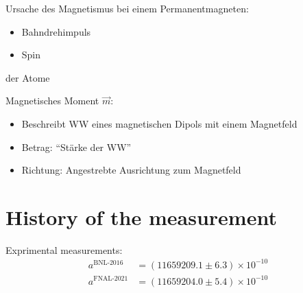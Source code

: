 \documentclass[12pt]{beamer}
\begin{document}
\begin{frame}{\insertsection}
  Ursache des Magnetismus bei einem Permanentmagneten:
  \begin{itemize}
  \item Bahndrehimpuls
  \item Spin
  \end{itemize}
  der Atome
\end{frame}

\begin{frame}{\insertsection}
  Magnetisches Moment $\vec{m}$:
  \begin{itemize}
  \item Beschreibt WW eines magnetischen Dipols mit einem Magnetfeld
  \item Betrag: "`Stärke der WW"'
  \item Richtung: Angestrebte Ausrichtung zum Magnetfeld
  \end{itemize}
\end{frame}


\section{History of the measurement}

\newcommand{\amuBNL}{11659209.1} %
\newcommand{\DamuBNL}{6.3}
\newcommand{\numamuBNL}{\num{\amuBNL}}

\newcommand{\amuFNAL}{11659204.0}
\newcommand{\DamuFNAL}{5.4}
\newcommand{\numamuFNAL}{\num{\amuFNAL}}

\begin{frame}{\insertsection}
  Exprimental measurements:
  \begin{align*}
    a^{\text{BNL-2016}} &= (\numamuBNL \pm \DamuBNL)\times 10^{-10} \\
    a^{\text{FNAL-2021}} &= (\numamuFNAL \pm \DamuFNAL)\times 10^{-10}
  \end{align*}
\end{frame}

\begin{frame}{\insertsection}
  \begin{center}
  \end{center}
\end{frame}
\end{document}

